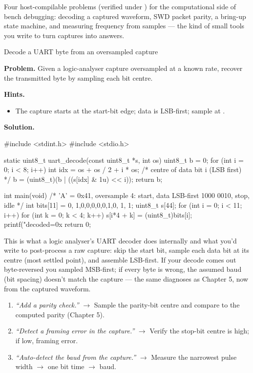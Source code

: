 \begin{partnote}
Four host-compilable problems (verified under
) for the computational side of bench
debugging: decoding a captured waveform, SWD packet parity, a bring-up state
machine, and measuring frequency from samples --- the kind of small tools you
write to turn captures into answers.
\end{partnote}

\begin{gymproblem}{Decode a UART byte from an oversampled capture}

\textbf{Problem.} Given a logic-analyser capture oversampled at a known rate,
recover the transmitted byte by sampling each bit centre.

\textbf{Hints.}
\begin{itemize}
\item The capture starts at the start-bit edge; data is LSB-first; sample at
  .
\end{itemize}

\attempt

\textbf{Solution.}
\begin{cgym}
#include <stdint.h>
#include <stdio.h>

static uint8_t uart_decode(const uint8_t *s, int os) {
    uint8_t b = 0;
    for (int i = 0; i < 8; i++) {
        int idx = os + os / 2 + i * os;          /* centre of data bit i (LSB first) */
        b = (uint8_t)(b | ((s[idx] & 1u) << i));
    }
    return b;
}

int main(void) {
    /* 'A' = 0x41, oversample 4: start, data LSB-first 1000 0010, stop, idle */
    int bits[11] = {0, 1,0,0,0,0,0,1,0, 1, 1};
    uint8_t s[44];
    for (int i = 0; i < 11; i++)
        for (int k = 0; k < 4; k++) s[i*4 + k] = (uint8_t)bits[i];
    printf("decoded=0x%
    return 0;
}
\end{cgym}

This is what a logic analyser's UART decoder does internally and what you'd write
to post-process a raw capture: skip the start bit, sample each data bit at its
centre (most settled point), and assemble LSB-first. If your decode comes out
byte-reversed you sampled MSB-first; if every byte is wrong, the assumed baud
(bit spacing) doesn't match the capture --- the same diagnoses as Chapter 5, now
from the captured waveform.

\followups
\begin{enumerate}
\item \emph{``Add a parity check.''} $\rightarrow$ Sample the parity-bit centre
  and compare to the computed parity (Chapter 5).
\item \emph{``Detect a framing error in the capture.''} $\rightarrow$ Verify the
  stop-bit centre is high; if low, framing error.
\item \emph{``Auto-detect the baud from the capture.''} $\rightarrow$ Measure the
  narrowest pulse width $\rightarrow$ one bit time $\rightarrow$ baud.
\end{enumerate}
\end{gymproblem}

